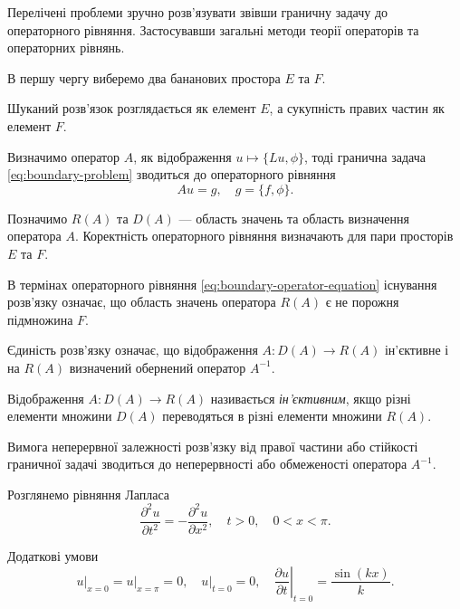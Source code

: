 Перелічені проблеми зручно розв'язувати звівши граничну задачу до операторного рівняння. Застосувавши загальні методи теорії операторів та операторних рівнянь. \medskip

В першу чергу виберемо два бананових простора $E$ та $F$. \medskip

Шуканий розв'язок розглядається як елемент $E$, а сукупність правих частин як елемент $F$. \medskip

Визначимо оператор $A$, як відображення $u \mapsto \{Lu, \phi\}$, тоді гранична задача
\eqref{eq:boundary-problem} зводиться до операторного рівняння
\begin{equation}
    \label{eq:boundary-operator-equation}
    A u = g, \quad g = \{f, \phi\}.
\end{equation}

Позначимо $R(A)$ та $D(A)$ --- область значень та область визначення оператора $A$. Коректність операторного рівняння визначають для пари просторів $E$ та $F$. \medskip

В термінах операторного рівняння \eqref{eq:boundary-operator-equation} існування розв'язку означає, що область значень оператора $R(A)$ є не порожня підмножина $F$. \medskip

Єдиність розв'язку означає, що відображення $A: D(A) \to R(A)$ ін'єктивне і на $R(A)$ визначений обернений оператор $A^{-1}$.

\begin{definition}
    Відображення $A: D(A) \to R(A)$ називається \textit{ін'єктивним}, якщо різні елементи множини $D(A)$ переводяться в різні елементи множини $R(A)$.    
\end{definition}

Вимога неперервної залежності розв'язку від правої частини або стійкості граничної задачі зводиться до неперервності або обмеженості оператора $A^{-1}$.


\begin{example}
    Розглянемо рівняння Лапласа
    \begin{equation}
        \frac{\partial^2 u}{\partial t^2} = - \frac{\partial^2 u}{\partial x^2}, \quad t > 0, \quad 0 < x < \pi.
    \end{equation}

    Додаткові умови
    \begin{equation}
        \left. u \right|_{x = 0} = \left. u \right|_{x = \pi} = 0, \quad \left. u \right|_{t = 0} = 0, \quad \left. \frac{\partial u}{\partial t} \right|_{t = 0} = \frac{\sin (k x)}{k}.
    \end{equation}
\end{example}

